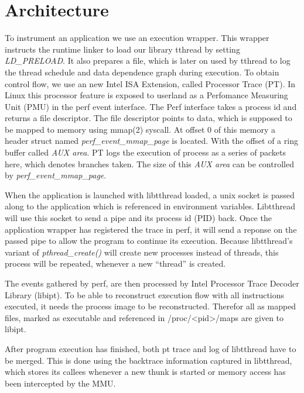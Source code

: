 \section{Architecture}
\label{sec:introduction}

To instrument an application we use an execution wrapper. This wrapper instructs
the runtime linker to load our library tthread by setting \emph{LD\_PRELOAD}. It
also prepares a file, which is later on used by tthread to log the thread
schedule and data dependence graph during execution. To obtain control flow, we
use an new Intel ISA Extension, called Processor Trace (PT). In Linux this
processor feature is exposed to userland as a Perfomance Measuring Unit (PMU) in
the perf event interface. The Perf interface takes a process id and returns a
file descriptor. The file descriptor points to data, which is supposed to be
mapped to memory using mmap(2) syscall. At offset 0 of this memory a header
struct named \emph{perf\_event\_mmap\_page} is located.
With the offset of a ring buffer called \emph{AUX area}. PT logs the execution
of process as a series of packets here, which denotes branches taken.
The size of this \emph{AUX area} can be controlled by \emph{perf\_event\_mmap\_page}.

When the application is launched with libtthread loaded,
a unix socket is passed along to the application which is referenced in environment variables.
Libtthread will use this socket to send a pipe and its process id (PID) back.
Once the application wrapper has registered the trace in perf,
it will send a reponse on the passed pipe to allow the program to continue its
execution. Because libtthread's variant of \emph{pthread\_create()} will create
new processes instead of threads, this process will be repeated, whenever a new
"`thread"' is created.

The events gathered by perf, are then processed by Intel Processor Trace Decoder
Library (libipt). To be able to reconstruct execution flow with all
instructions executed, it needs the process image to be reconstructed. Therefor
all as mapped files, marked as executable and referenced in /proc/<pid>/maps are
given to libipt.

After program execution has finished, both pt trace and log of libtthread have
to be merged. This is done using the backtrace information captured in
libtthread, which stores its callees whenever a new thunk is started or memory
access has been intercepted by the MMU.

